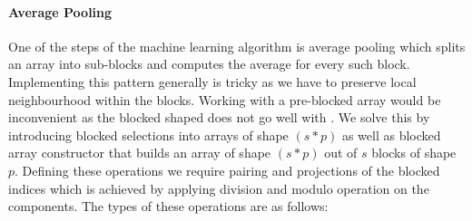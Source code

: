 \paragraph{Average Pooling}
One of the steps of the machine learning algorithm is average pooling which
splits an array into sub-blocks and computes the average for every such
block.  Implementing this pattern generally is tricky as we have to
preserve local neighbourhood within the blocks.  Working with a
pre-blocked array would be inconvenient as the blocked shaped
does not go well with .  We solve this by introducing
blocked selections into arrays of shape $(s * p)$ as well
as blocked array constructor  that builds an array of
shape $(s * p)$ out of $s$ blocks of shape $p$.  Defining these
operations we require pairing and projections of the blocked indices
which is achieved by applying division and modulo operation on the
components.  The types of these operations are as follows:
